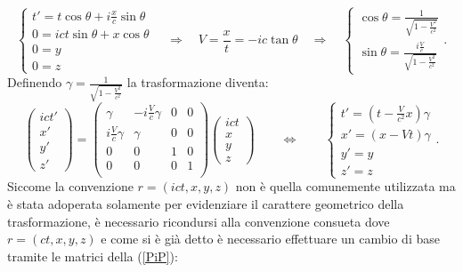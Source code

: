 \begin{equation*}
    \begin{cases}
        t'=t\cos\theta+i\frac{x}{c}\sin\theta\\
        0=ict\sin\theta+x\cos\theta\\
        0=y\\
        0=z
       \end{cases}
    \quad \Rightarrow \quad
    V=\frac{x}{t}=-ic\tan\theta \quad \Rightarrow \quad
    \begin{cases}
        \cos\theta=\frac{1}{\sqrt{1-\frac{V^2}{c^2}}}\\
        \sin\theta=\frac{i\frac{V}{c}}{\sqrt{1-\frac{V^2}{c^2}}}
    \end{cases}.
\end{equation*}
Definendo $\gamma=\frac{1}{\sqrt{1-\frac{V^2}{c^2}}}$ la trasformazione diventa:
\begin{equation*}
    \begin{pmatrix}
     ict'\\x'\\y'\\z'
    \end{pmatrix}
    =\begin{pmatrix}
     \gamma & -i\frac{V}{c}\gamma & 0 & 0\\
     i\frac{V}{c}\gamma & \gamma & 0 & 0\\
     0& 0 & 1 & 0\\
     0& 0 & 0 & 1\\
    \end{pmatrix}
    \begin{pmatrix}
     ict\\x\\y\\z
    \end{pmatrix}\qquad
    \Leftrightarrow   \qquad
    \begin{cases}
     t'=(t-\frac{V}{c^2}x)\gamma\\
     x'=(x-Vt)\gamma\\
     y'=y\\
     z'=z
    \end{cases}.
 \end{equation*}
 Siccome la convenzione $r=(ict,x,y,z)$ non è quella comunemente utilizzata ma è stata adoperata solamente per evidenziare il carattere geometrico della trasformazione, è necessario ricondursi alla convenzione consueta dove $r=(ct,x,y,z)$ e come si è già detto è necessario effettuare un cambio di base tramite le matrici della (\ref{PiP}):
